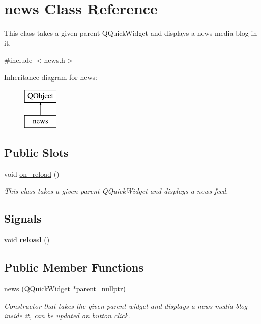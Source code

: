 \hypertarget{classnews}{}\section{news Class Reference}
\label{classnews}


This class takes a given parent Q\+Quick\+Widget and displays a news media blog in it.  




{\ttfamily \#include $<$news.\+h$>$}

Inheritance diagram for news\+:\begin{figure}[H]
\begin{center}
\leavevmode
\includegraphics[height=2.000000cm]{classnews}
\end{center}
\end{figure}
\subsection*{Public Slots}
\begin{DoxyCompactItemize}
\item 
void \mbox{\hyperlink{classnews_a048f06e78e76602e4a8d2eb560bf9a23}{on\+\_\+reload}} ()
\begin{DoxyCompactList}\small\item\em This class takes a given parent Q\+Quick\+Widget and displays a news feed. \end{DoxyCompactList}\end{DoxyCompactItemize}
\subsection*{Signals}
\begin{DoxyCompactItemize}
\item 
\mbox{\label{classnews_a81a386e5beb8547d605d862a25623310}} 
void {\bfseries reload} ()
\end{DoxyCompactItemize}
\subsection*{Public Member Functions}
\begin{DoxyCompactItemize}
\item 
\mbox{\hyperlink{classnews_ac5f561e7fd8a2773200bf2925208a732}{news}} (Q\+Quick\+Widget $\ast$parent=nullptr)
\begin{DoxyCompactList}\small\item\em Constructor that takes the given parent widget and displays a news media blog inside it, can be updated on button click. \end{DoxyCompactList}\end{DoxyCompactItemize}
